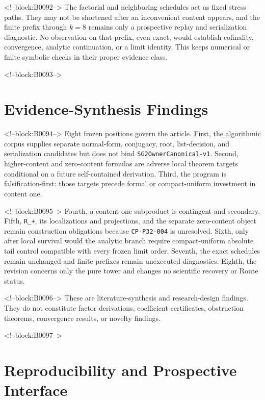 \documentclass[11pt]{article}
\begin{document}
<!--block:B0092-->
The factorial and neighboring schedules act as fixed stress paths. They
may not be shortened after an inconvenient content appears, and the
finite prefix through $k=8$ remains only a prospective replay and
serialization diagnostic. No observation on that prefix, even exact,
would establish cofinality, convergence, analytic continuation, or a
limit identity. This keeps numerical or finite symbolic checks in their
proper evidence class.

<!--block:B0093-->
\hypertarget{5-evidence-synthesis-findings}{%
\section{Evidence-Synthesis
Findings}\label{5-evidence-synthesis-findings}}

<!--block:B0094-->
Eight frozen positions govern the article. First, the algorithmic corpus
supplies separate normal-form, conjugacy, root, list-decision, and
serialization candidates but does not bind
\texttt{SG2OwnerCanonical-v1}. Second, higher-content and zero-content
formulas are adverse local theorem targets conditional on a future
self-contained derivation. Third, the program is falsification-first:
those targets precede formal or compact-uniform investment in content
one.

<!--block:B0095-->
Fourth, a content-one subproduct is contingent and secondary. Fifth,
\texttt{R\_+}, its localizations and projections, and the separate
zero-content object remain construction obligations because
\texttt{CP-P32-004} is unresolved. Sixth, only after local survival
would the analytic branch require compact-uniform absolute tail control
compatible with every frozen limit order. Seventh, the exact schedules
remain unchanged and finite prefixes remain unexecuted diagnostics.
Eighth, the revision concerns only the pure tower and changes no
scientific recovery or Route status.

<!--block:B0096-->
These are literature-synthesis and research-design findings. They do not
constitute factor derivations, coefficient certificates, obstruction
theorems, convergence results, or novelty findings.

<!--block:B0097-->
\hypertarget{6-reproducibility-and-prospective-interface}{%
\section{Reproducibility and Prospective
Interface}\label{6-reproducibility-and-prospective-interface}}
\end{document}
